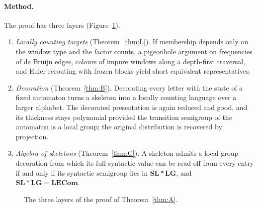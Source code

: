 \documentclass[11pt]{article}
\numberwithin{equation}{section}
\theoremstyle{plain}
\theoremstyle{definition}
\theoremstyle{remark}
\theoremstyle{plain}
\newcommand{\tuple}[1]{\vec{#1}}
\newcommand{\LG}{\mathbf{LG}}
\newcommand{\SL}{\mathbf{SL}}
\newcommand{\LECom}{\mathbf{L}\mathbf{ECom}}
\begin{document}
\paragraph{Method.}
The proof has three layers (Figure~\ref{fig:layers}).
\begin{enumerate}[label=(\arabic*),leftmargin=*]
\item \emph{Locally counting targets} (Theorem~\ref{thm:L}).  If membership
depends only on the window type and the factor counts, a pigeonhole argument on
frequencies of de Bruijn edges, colours of impure windows along a depth-first
traversal, and Euler rerouting with frozen blocks yield short equivalent
representatives.
\item \emph{Decoration} (Theorem~\ref{thm:B}).  Decorating every letter with the
state of a fixed automaton turns a skeleton into a locally counting language
over a larger alphabet.  The decorated presentation is again reduced and good,
and its thickness stays polynomial provided the transition semigroup of the
automaton is a local group; the original distribution is recovered by
projection.
\item \emph{Algebra of skeletons} (Theorem~\ref{thm:C}).  A skeleton admits a
local-group decoration from which its full syntactic value can be read off
from every entry if and only if its syntactic semigroup lies in $\SL*\LG$, and
$\SL*\LG=\LECom$.
\end{enumerate}

\begin{figure}[t]
\centering
{}
\caption{The three layers of the proof of Theorem~\ref{thm:A}.}
\label{fig:layers}
\end{figure}
\end{document}
